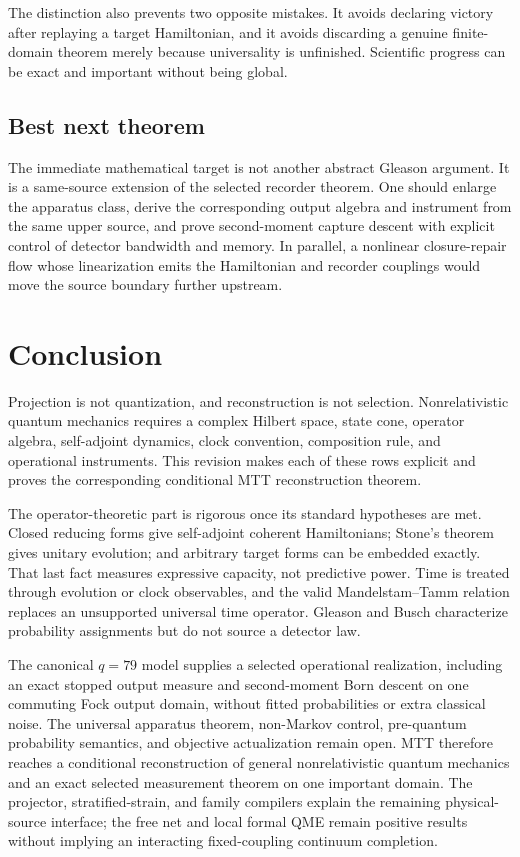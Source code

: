 \documentclass[11pt]{article}
\theoremstyle{definition}
\theoremstyle{remark}
\begin{document}
The distinction also prevents two opposite mistakes.  It avoids declaring
victory after replaying a target Hamiltonian, and it avoids discarding a
genuine finite-domain theorem merely because universality is unfinished.
Scientific progress can be exact and important without being global.

\subsection{Best next theorem}

The immediate mathematical target is not another abstract Gleason argument.
It is a same-source extension of the selected recorder theorem.  One should
enlarge the apparatus class, derive the corresponding output algebra and
instrument from the same upper source, and prove second-moment capture
descent with explicit control of detector bandwidth and memory.  In
parallel, a nonlinear closure-repair flow whose linearization emits the
Hamiltonian and recorder couplings would move the source boundary further
upstream.

\section{Conclusion}

Projection is not quantization, and reconstruction is not selection.
Nonrelativistic quantum mechanics requires a complex Hilbert space, state
cone, operator algebra, self-adjoint dynamics, clock convention, composition
rule, and operational instruments. This revision makes each of these rows
explicit and proves the corresponding conditional MTT reconstruction
theorem.

The operator-theoretic part is rigorous once its standard hypotheses are
met.  Closed reducing forms give self-adjoint coherent Hamiltonians; Stone's
theorem gives unitary evolution; and arbitrary target forms can be embedded
exactly.  That last fact measures expressive capacity, not predictive power.
Time is treated through evolution or clock observables, and the valid
Mandelstam--Tamm relation replaces an unsupported universal time operator.
Gleason and Busch characterize probability assignments but do not source a
detector law.

The canonical \(q=79\) model supplies a selected operational realization,
including an exact stopped output measure and second-moment Born
descent on one commuting Fock output domain, without fitted probabilities or
extra classical noise.  The universal apparatus theorem, non-Markov
control, pre-quantum probability semantics, and objective actualization
remain open.  MTT therefore reaches a conditional reconstruction of general
nonrelativistic quantum mechanics and an exact selected measurement theorem
on one important domain. The projector, stratified-strain, and family
compilers explain the remaining physical-source interface; the free net and
local formal QME remain positive results without implying an interacting
fixed-coupling continuum completion.
\end{document}
